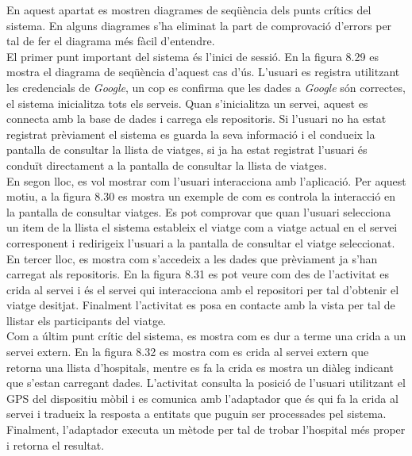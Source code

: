 En aquest apartat es mostren diagrames de seqüència dels punts crítics del sistema. En alguns diagrames s'ha eliminat la part de comprovació d'errors per tal de fer el diagrama més fàcil d'entendre.\\

El primer punt important del sistema és l'inici de sessió. En la figura 8.29 es mostra el diagrama de seqüència d'aquest cas d'ús. L'usuari es registra utilitzant les credencials de \textit{Google}, un cop es confirma que les dades a \textit{Google} són correctes, el sistema inicialitza tots els serveis. Quan s'inicialitza un servei, aquest es connecta amb la base de dades i carrega els repositoris. Si l'usuari no ha estat registrat prèviament el sistema es guarda la seva informació i el condueix la pantalla de consultar la llista de viatges, si ja ha estat registrat l'usuari és conduït directament a la pantalla de consultar la llista de viatges.\\

En segon lloc, es vol mostrar com l'usuari interacciona amb l'aplicació. Per aquest motiu, a la figura 8.30 es mostra un exemple de com es controla la interacció en la pantalla de consultar viatges. Es pot comprovar que quan l'usuari selecciona un item de la llista el sistema estableix el viatge com a viatge actual en el servei corresponent i redirigeix l'usuari a la pantalla de consultar el viatge seleccionat.\\

En tercer lloc, es mostra com s'accedeix a les dades que prèviament ja s'han carregat als repositoris. En la figura 8.31 es pot veure com des de l'activitat es crida al servei i és el servei qui interacciona amb el repositori per tal d'obtenir el viatge desitjat. Finalment l'activitat es posa en contacte amb la vista per tal de llistar els participants del viatge.\\

Com a últim punt crític del sistema, es mostra com es dur a terme una crida a un servei extern. En la figura 8.32 es mostra com es crida al servei extern que retorna una llista d'hospitals, mentre es fa la crida es mostra un diàleg indicant que s'estan carregant dades. L'activitat consulta la posició de l'usuari utilitzant el GPS del dispositiu mòbil i es comunica amb l'adaptador que és qui fa la crida al servei i tradueix la resposta a entitats que puguin ser processades pel sistema. Finalment, l'adaptador executa un mètode per tal de trobar l'hospital més proper i retorna el resultat.

